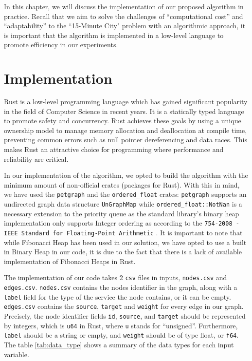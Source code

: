 In this chapter, we will discuss the implementation of our proposed algorithm in practice. Recall that we aim to solve the challenges of ``computational cost'' and ``adaptability'' \cite{lima_quest_2023} to the ``15-Minute City" problem with an algorithmic approach, it is important that the algorithm is implemented in a low-level language to promote efficiency in our experiments.

\section{Implementation}

Rust is a low-level programming language which has gained significant popularity in the field of Computer Science in recent years. It is a statically typed language to promote safety and concurrency. Rust achieves these goals by using a unique ownership model to manage memory allocation and deallocation at compile time, preventing common errors such as null pointer dereferencing and data races. This makes Rust an attractive choice for programming where performance and reliability are critical.

In our implementation of the algorithm, we opted to build the algorithm with the minimum amount of non-official crates (packages for Rust). With this in mind, we have used the \verb|petgraph| and the \verb|ordered_float| crates: \verb|petgraph| \cite{petgraph} supports an undirected graph data structure \verb|UnGraphMap| while \verb|ordered_float::NotNan| \cite{ordered_float} is a necessary extension to the priority queue as the standard library's binary heap implementation only supports Integer ordering as according to the \verb|754-2008 - IEEE Standard for Floating-Point Arithmetic| \cite{IEEE}. It is important to note that while Fibonacci Heap has been used in our solution, we have opted to use a built in Binary Heap in our code, it is due to the fact that there is a lack of available implementation of Fibonacci Heaps in Rust.

The implementation of our code takes 2 \verb|csv| files in inputs, \verb|nodes.csv| and \verb|edges.csv|. \verb|nodes.csv| contains the nodes identifier in the graph, along with a \verb|label| field for the type of the service the node contains, or it can be empty. \verb|edges.csv| contains the \verb|source|, \verb|target| and \verb|weight| for every edge in our graph. Precisely, the node identifier fields \verb|id|, \verb|source|, and \verb|target| should be represented by integers, which is \verb|u64| in Rust, where \verb|u| stands for ``unsigned''. Furthermore, \verb|label| should be a string or empty, and \verb|weight| should be of type float, or \verb|f64|. The table \ref{tab:data_type} shows a summary of the data types for each input variable.

